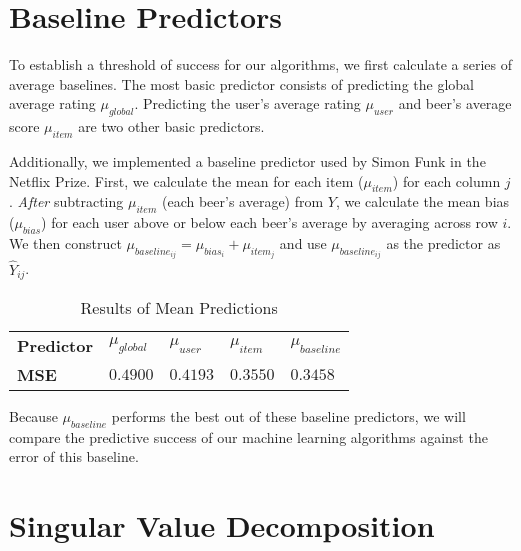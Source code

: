 \documentclass[12pt]{article}
\begin{document}
\section{Baseline Predictors}
To establish a threshold of success for our algorithms, we first calculate a series of average baselines. The most basic predictor consists of predicting the global average rating $\mu_{global}$. Predicting the user's average rating $\mu_{user}$ and beer's average score $\mu_{item}$ are two other basic predictors.

Additionally, we implemented a baseline predictor used by Simon Funk in the Netflix Prize.\textsuperscript{\cite{Funk}} First, we calculate the mean for each item ($\mu_{item}$) for each column $j$. \textit{After} subtracting $\mu_{item}$ (each beer's average) from $Y$, we calculate the mean bias ($\mu_{bias}$) for each user above or below each beer's average by averaging across row $i$. We then construct ${\mu}_{baseline_{ij}} = \mu_{bias_i} + \mu_{item_j}$ and use $\mu_{baseline_{ij}}$ as the predictor as $\hat{Y}_{ij}$.


\begin{table}[ht!]
\centering
\caption{Results of Mean Predictions}
\vspace{2mm}
\begin{tabular}{lllll}
\hline
\textbf{Predictor}         & $\mu_{global}$ & $\mu_{user}$ & $\mu_{item}$ & $\mu_{baseline}$ \\
\textbf{MSE}              & $0.4900$       & $0.4193$     & $0.3550$     & $0.3458$         \\ \hline
\end{tabular}
\end{table}

Because ${\mu}_{baseline}$ performs the best out of these baseline predictors, we will compare the predictive success of our machine learning algorithms against the error of this baseline.

\section{Singular Value Decomposition}
\end{document}
